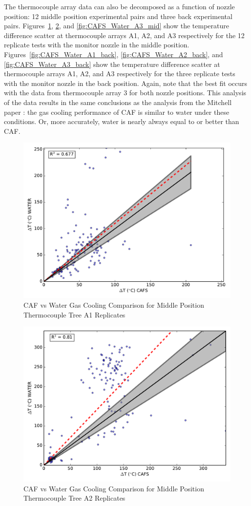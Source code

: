 \documentclass[12pt,oneside]{book}
\begin{document}
\clearpage

The thermocouple array data can also be decomposed as a function of nozzle position: 12 middle position experimental pairs and three back experimental pairs. Figures~\ref{fig:CAFS_Water_A1_mid}, \ref{fig:CAFS_Water_A2_mid}, and \ref{fig:CAFS_Water_A3_mid} show the temperature difference scatter at thermocouple arrays A1, A2, and A3 respectively for the 12 replicate tests with the monitor nozzle in the middle position. Figures~\ref{fig:CAFS_Water_A1_back}, \ref{fig:CAFS_Water_A2_back}, and \ref{fig:CAFS_Water_A3_back} show the temperature difference scatter at thermocouple arrays A1, A2, and A3 respectively for the three replicate tests with the monitor nozzle in the back position. Again, note that the best fit occurs with the data from thermocouple array 3 for both nozzle positions. This analysis of the data results in the same conclusions as the analysis from the Mitchell paper \cite{Mitchell:1}: the gas cooling performance of CAF is similar to water under these conditions. Or, more accurately, water is nearly always equal to or better than CAF.

\begin{figure}[!ht]
	\includegraphics[width=.7\columnwidth]{../Figures/Gas_Cooling/Combined_mid_A1_scatter}
	\caption{CAF vs Water Gas Cooling Comparison for Middle Position Thermocouple Tree A1 Replicates}
	\label{fig:CAFS_Water_A1_mid}
\end{figure}

\begin{figure}[!ht]
	\includegraphics[width=.7\columnwidth]{../Figures/Gas_Cooling/Combined_mid_A2_scatter}
	\caption{CAF vs Water Gas Cooling Comparison for Middle Position Thermocouple Tree A2 Replicates}
	\label{fig:CAFS_Water_A2_mid}
\end{figure}
\end{document}
